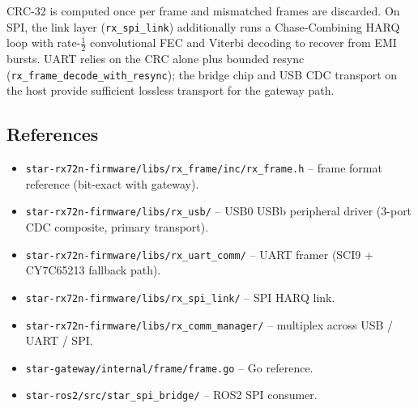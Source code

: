 CRC-32 is computed once per frame and mismatched frames are discarded. On SPI,
the link layer (\texttt{rx\_spi\_link}) additionally runs a Chase-Combining
HARQ loop with rate-$\frac{1}{2}$ convolutional FEC and Viterbi decoding to
recover from EMI bursts. UART relies on the CRC alone plus bounded resync
(\texttt{rx\_frame\_decode\_with\_resync}); the bridge chip and USB CDC
transport on the host provide sufficient lossless transport for the gateway
path.

\subsection{References}

\begin{itemize}
  \item \texttt{star-rx72n-firmware/libs/rx\_frame/inc/rx\_frame.h} -- frame
        format reference (bit-exact with gateway).
  \item \texttt{star-rx72n-firmware/libs/rx\_usb/} -- USB0 USBb peripheral
        driver (3-port CDC composite, primary transport).
  \item \texttt{star-rx72n-firmware/libs/rx\_uart\_comm/} -- UART framer
        (SCI9 + CY7C65213 fallback path).
  \item \texttt{star-rx72n-firmware/libs/rx\_spi\_link/} -- SPI HARQ link.
  \item \texttt{star-rx72n-firmware/libs/rx\_comm\_manager/} -- multiplex
        across USB / UART / SPI.
  \item \texttt{star-gateway/internal/frame/frame.go} -- Go reference.
  \item \texttt{star-ros2/src/star\_spi\_bridge/} -- ROS2 SPI consumer.
\end{itemize}
